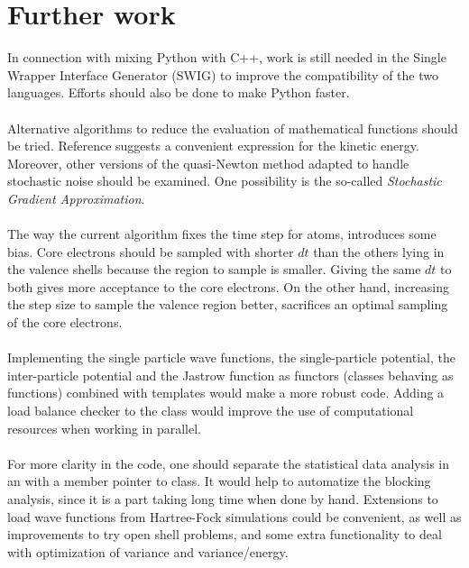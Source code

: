 \section{Further work}

In connection with mixing Python with C++, work is still needed in the Single Wrapper Interface Generator (SWIG) to improve the compatibility of the two languages. Efforts should also be done to make Python faster.\\
\\
Alternative algorithms to reduce the evaluation of mathematical functions should be tried. Reference \cite{PaulKent} suggests a convenient expression for the kinetic energy. Moreover, other versions of the quasi-Newton method adapted to handle  stochastic noise should be examined. One possibility is the  so-called \emph{Stochastic Gradient Approximation}\cite{Harju1997}.\\
\\
The way the current algorithm fixes the time step for atoms, introduces some bias. Core electrons should be sampled with shorter $dt$ than the others lying in the valence shells because the region to sample is smaller. Giving the same $dt$ to both gives more acceptance to the core electrons. On the other hand, increasing the step size to sample the valence region better, sacrifices an optimal sampling of the core electrons.\\
\\
Implementing the single particle wave functions, the single-particle potential, the inter-particle potential and the Jastrow function as functors (classes behaving as functions) combined with templates would make a more robust code. Adding a load balance checker to the  class would improve the use of computational resources when working in parallel. \\
\\
For more clarity in the code, one should separate the statistical data analysis in an  with a member pointer to  class. It would help to automatize the blocking analysis, since it is a part taking long time when done by hand. Extensions to load wave functions from Hartree-Fock simulations could be convenient, as well as improvements to try open shell problems, and some extra functionality to deal with optimization of variance and variance/energy.

\clearemptydoublepage

